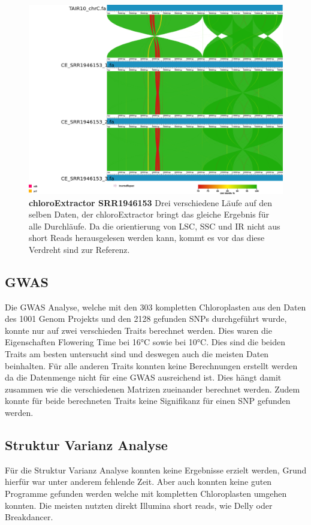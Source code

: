 \documentclass{scrartcl}
\begin{document}
\begin{figure}
\includegraphics[width=.9\linewidth]{./SRR1946153_CE_1.png}
\caption[chloroExtractor SRR1946153]{\textbf{chloroExtractor SRR1946153} Drei verschiedene Läufe auf den selben Daten, der chloroExtractor bringt das gleiche Ergebnis für alle Durchläufe. Da die orientierung von LSC, SSC und IR nicht aus short Reads herausgelesen werden kann, kommt es vor das diese Verdreht sind zur Referenz.}
\end{figure}
\subsection{GWAS}
\label{sec-4-8}
Die GWAS Analyse, welche mit den 303 kompletten Chloroplasten aus den Daten des 1001 Genom Projekts und den 2128 gefunden SNPs durchgeführt wurde, konnte nur auf zwei verschieden Traits berechnet werden. Dies waren 
die Eigenschaften Flowering Time bei 16°C sowie bei 10°C. Dies sind die beiden Traits am besten untersucht sind und deswegen auch die meisten Daten beinhalten. Für alle anderen Traits konnten
keine Berechnungen erstellt werden da die Datenmenge nicht für eine GWAS ausreichend ist. Dies hängt damit zusammen wie die verschiedenen Matrizen zueinander berechnet werden.
Zudem konnte für beide berechneten Traits keine Signifikanz für einen SNP gefunden werden.
\subsection{Struktur Varianz Analyse}
\label{sec-4-9}
Für die Struktur Varianz Analyse konnten keine Ergebnisse erzielt werden, Grund hierfür war unter anderem fehlende Zeit. Aber auch konnten keine guten Programme gefunden werden welche mit kompletten Chloroplasten
umgehen konnten. Die meisten nutzten direkt Illumina short reads, wie Delly\footnotemark[58]{} oder Breakdancer\footnotemark[57]{}. 
\end{document}
